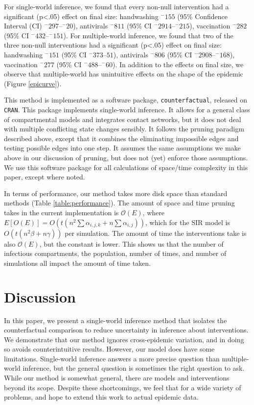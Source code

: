 \documentclass[openacc]{rsproca_new}%
\renewcommand{\neg}[1]{^{-}#1}
\begin{document}
For single-world inference, we found that every non-null intervention had a significant (p<.05) effect on final size: handwashing $\neg 155$ (95\% Confidence Interval (CI) $\neg 297$--$\neg 20$), antivirals $\neg 811$ (95\% CI $\neg 2914$--$\neg 215$), vaccination $\neg 282$ (95\% CI $\neg 432$--$\neg 151$).
For multiple-world inference, we found that two of the three non-null interventions had a significant (p<.05) effect on final size: handwashing $\neg 151$ (95\% CI $\neg 373$--$51$), antivirals $\neg 806$ (95\% CI $\neg 2908$--$\neg 168$), vaccination $\neg 277$ (95\% CI $\neg 488$--$\neg 60$).
In addition to the effects on final size, we observe that multiple-world has unintuitive effects on the shape of the epidemic (Figure \ref{epicurve}).

This method is implemented as a software package, \texttt{counterfactual}, released on \texttt{CRAN}. %
This package implements single-world inference. 
It allows for a general class of compartmental models and integrates contact networks, but it does not deal with multiple conflicting state changes sensibly.
It follows the pruning paradigm described above, except that it combines the eliminating impossible edges and testing possible edges into one step.
It assumes the same assumptions we make above in our discussion of pruning, but does not (yet) enforce those assumptions.
We use this software package for all calculations of space/time complexity in this paper, except where noted.

In terms of performance, our method takes more disk space than standard methods (Table \ref{table:performance}).
The amount of space and time pruning takes in the current implementation is $\mathcal O(E)$, where $E[O(E)] = O(t(n^2\sum \alpha_{i,j,k} + n \sum\alpha_{i,j}))$, which for the SIR model is $O(t(n^2\beta + n\gamma))$ per simulation.
The amount of time the interventions take is also $\mathcal O(E)$, but the constant is lower.
This shows us that the number of infectious compartments, the population, number of times, and number of simulations all impact the amount of time taken.

\section{Discussion}
In this paper, we present a single-world inference method that isolates the counterfactual comparison to reduce uncertainty in inference about interventions.
We demonstrate that our method ignores cross-epidemic variation, and in doing so avoids counterintuitive results.
However, our model does have some limitations.
Single-world inference answers a more precise question than multiple-world inference, but the general question is sometimes the right question to ask.
While our method is somewhat general, there are models and interventions beyond its scope.
Despite these shortcomings, we feel that for a wide variety of problems, and hope to extend this work to actual epidemic data.
\end{document}
